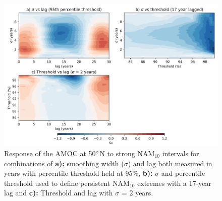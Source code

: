 \newpage
\begin{figure}[h!]
\begin{center}
\noindent\includegraphics[width =\linewidth]{Figures/Figures-surface/sensitivity_contours_strong.png} 
\caption[$\sigma$/threshold/lag parameter grids for AMOC responses to NAM$_{10}$ intervals]{Response of the AMOC at 50$\degree$N to strong NAM$_{10}$ intervals for combinations of \textbf{a):} smoothing width ($\sigma$) and lag both measured in years with percentile threshold held at 95\%, \textbf{b):} $\sigma$ and percentile threshold used to define persistent NAM$_{10}$ extremes with a 17-year lag and \textbf{c):} Threshold and lag with $\sigma$ = 2 years.}
\label{sensitivity}
\end{center}
\end{figure}

